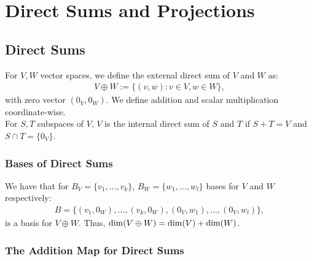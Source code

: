 \section{Direct Sums and Projections}

\subsection{Direct Sums}

For $V, W$ vector spaces, we define the external direct sum of $V$ and
$W$ as: \begin{gather*}
    V \oplus W := \{(v, w) : v \in V, w \in W\},
\end{gather*} with zero vector $(0_V, 0_W)$. We define addition and scalar multiplication
coordinate-wise.
\\[\baselineskip]
For $S, T$ subspaces of $V$, $V$ is the internal direct sum of $S$ and $T$
if $S + T = V$ and $S \cap T = \{0_V\}$. 

\subsubsection{Bases of Direct Sums}

We have that for $B_V = \{v_1, \ldots, v_k\}$, $B_W = \{w_1, \ldots, w_l\}$ 
bases for $V$ and $W$ respectively: \begin{gather*}
    B = \{(v_1, 0_W), \ldots, (v_k, 0_W), (0_V, w_1), \ldots, (0_V, w_l)\},
\end{gather*} is a basis for $V \oplus W$. Thus, $\operatorname{dim}(V \oplus W) = \operatorname{dim}(V) + \operatorname{dim}(W)$.

\subsubsection{The Addition Map for Direct Sums} \label{addmapdirect}


